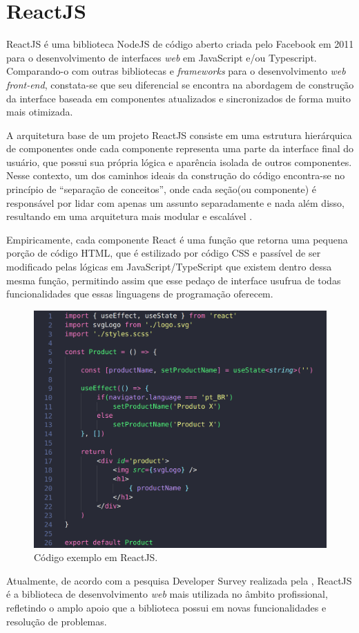 \section{ReactJS}
\label{sec:reactJS}
ReactJS é uma biblioteca NodeJS de código aberto criada pelo Facebook em 2011 para o desenvolvimento de interfaces \textit{web} em JavaScript e/ou Typescript. Comparando-o com outras bibliotecas e \textit{frameworks} para o desenvolvimento \textit{web front-end}, constata-se que seu diferencial se encontra na abordagem de construção da interface baseada em componentes atualizados e sincronizados de forma muito mais otimizada.

A arquitetura base de um projeto ReactJS consiste em uma estrutura hierárquica de componentes onde cada componente representa uma parte da interface final do usuário, que possui sua própria lógica e aparência isolada de outros componentes. Nesse contexto, um dos caminhos ideais da construção do código encontra-se no princípio de “separação de conceitos”, onde cada seção(ou componente) é responsável por lidar com apenas um assunto separadamente e nada além disso, resultando em uma arquitetura mais modular e escalável \cite{Qawwas2022}.

Empiricamente, cada componente React é uma função que retorna uma pequena porção de código HTML, que é estilizado por código CSS e passível de ser modificado pelas lógicas em JavaScript/TypeScript que existem dentro dessa mesma função, permitindo assim que esse pedaço de interface usufrua de todas funcionalidades que essas linguagens de programação oferecem.

\begin{figure}[H]
    \centering
    \caption{Código exemplo em ReactJS.}
    \label{fig:reactJS}
    \includegraphics[width=.7\textwidth]{data/figures/react.png}
\end{figure}

Atualmente, de acordo com a pesquisa Developer Survey realizada pela , ReactJS é a biblioteca de desenvolvimento \textit{web} mais utilizada no âmbito profissional, refletindo o amplo apoio que a biblioteca possui em novas funcionalidades e resolução de problemas.